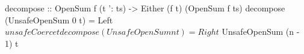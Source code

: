 \begin{code}
decompose
    :: OpenSum f (t ': ts)
    -> Either (f t) (OpenSum f ts)
decompose (UnsafeOpenSum 0 t) = Left  $ unsafeCoerce t
decompose (UnsafeOpenSum n t) = Right
                              $ UnsafeOpenSum (n - 1) t
\end{code}
